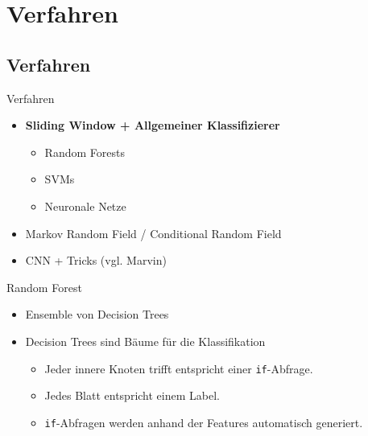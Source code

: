 \section{Verfahren}
\subsection{Verfahren}

\begin{frame}{Verfahren}
    \begin{itemize}[<+->]
        \item \textbf{Sliding Window + Allgemeiner Klassifizierer}
        \begin{itemize}
            \item Random Forests
            \item SVMs
            \item Neuronale Netze
        \end{itemize}
        \item Markov Random Field / Conditional Random Field
        \item CNN + Tricks (vgl. Marvin)
    \end{itemize}
\end{frame}

\begin{frame}{Random Forest}
    \begin{itemize}[<+->]
        \item Ensemble von Decision Trees
        \item Decision Trees sind Bäume für die Klassifikation
        \begin{itemize}
            \item Jeder innere Knoten trifft entspricht einer \texttt{if}-Abfrage.
            \item Jedes Blatt entspricht einem Label.
            \item \texttt{if}-Abfragen werden anhand der Features automatisch
                  generiert.
        \end{itemize}
    \end{itemize}
\end{frame}
